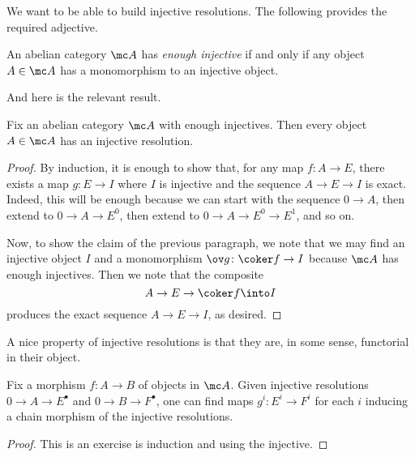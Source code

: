 \documentclass[../notes.tex]{subfiles}
\begin{document}
We want to be able to build injective resolutions. The following provides the required adjective.
\begin{definition}
	An abelian category $\mc A$ has \textit{enough injective} if and only if any object $A\in\mc A$ has a monomorphism to an injective object.
\end{definition}
And here is the relevant result.
\begin{proposition}
	Fix an abelian category $\mc A$ with enough injectives. Then every object $A\in\mc A$ has an injective resolution.
\end{proposition}
\begin{proof}
	By induction, it is enough to show that, for any map $f\colon A\to E$, there exists a map $g\colon E\to I$ where $I$ is injective and the sequence $A\to E\to I$ is exact. Indeed, this will be enough because we can start with the sequence $0\to A$, then extend to $0\to A\to E^0$, then extend to $0\to A\to E^0\to E^1$, and so on.

	Now, to show the claim of the previous paragraph, we note that we may find an injective object $I$ and a monomorphism $\ov g\colon\coker f\to I$ because $\mc A$ has enough injectives. Then we note that the composite
	\[A\to E\to\coker f\into I\]
	produces the exact sequence $A\to E\to I$, as desired.
\end{proof}
A nice property of injective resolutions is that they are, in some sense, functorial in their object.
\begin{proposition}
	Fix a morphism $f\colon A\to B$ of objects in $\mc A$. Given injective resolutions $0\to A\to E^\bullet$ and $0\to B\to F^\bullet$, one can find maps $g^i\colon E^i\to F^i$ for each $i$ inducing a chain morphism of the injective resolutions.
\end{proposition}
\begin{proof}
	This is an exercise is induction and using the injective.
\end{proof}
\end{document}
